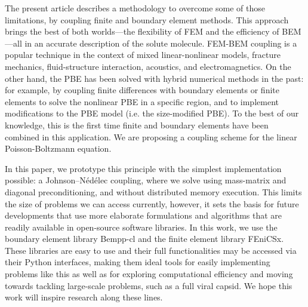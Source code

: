 The present article describes a methodology to overcome some of those limitations, by coupling finite and boundary element methods.
This approach brings the best of both worlds---the flexibility of FEM and the efficiency of BEM---all in an accurate description of the solute molecule.
FEM-BEM coupling is a popular technique in the context of mixed linear-nonlinear models,\cite{carstensen1995coupling,aurada2013classical} fracture mechanics,\cite{aour2007coupled} fluid-structure interaction,\cite{estorff1991fem} acoustics,\cite{hiptmair2006stabilized} and electromagnetics.\cite{matsuoka1988calculation,hiptmair2008stabilized,bruckner20123d}
On the other hand, the PBE has been solved with hybrid numerical methods in the past: for example, by coupling finite differences with boundary elements\cite{boschitsch2004hybrid} or finite elements\cite{xie2016new,ying2018hybrid} to solve the nonlinear PBE in a specific region, and to implement modifications to the PBE model (i.e. the size-modified PBE).
To the best of our knowledge, this is the first time finite and boundary elements have been combined in this application. We are proposing a coupling scheme for the linear Poisson-Boltzmann equation.

In this paper, we prototype this principle with the simplest implementation possible: a Johnson--N\'ed\'elec\cite{johnson1980coupling} coupling, where we solve using mass-matrix and diagonal preconditioning, and without distributed memory execution.
This limits the size of problems we can access currently, however, it sets the basis for future developments that use more elaborate formulations and algorithms that are readily available in open-source software libraries.
In this work, we use the boundary element library Bempp-cl\cite{BetckeScroggs2021} and the finite element library FEniCSx\cite{BasixJoss,BasixDofTransformations}.
These libraries are easy to use and their full functionalities may be accessed via their Python interfaces, making them ideal tools for easily implementing problems like this as well as for exploring computational efficiency and moving towards tackling large-scale problems, such as a full viral capsid.\cite{MartinezETal2019,wang2021high}
We hope this work will inspire research along these lines.

